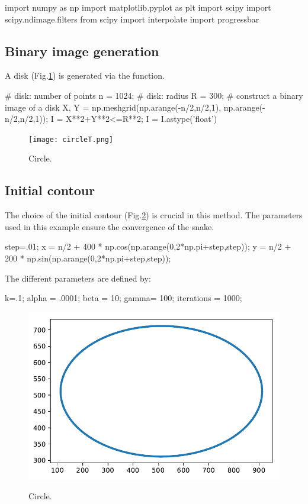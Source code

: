 \def\QRCODE{MASTER_mispa_TUT.IMG.active_contours_pythonqrcode.png}
\def\QRPAGE{http://www.iptutorials.science/tree/master/MASTER_mispa/TUT.IMG.active_contours/python}

\begin{python}
import numpy as np
import matplotlib.pyplot as plt
import scipy
import scipy.ndimage.filters
from scipy import interpolate
import progressbar
\end{python}

\subsection{Binary image generation}
A disk (Fig.\ref{fig:snakes:python:circle}) is generated via the  function.
\begin{python}
# disk: number of points
n = 1024;
# disk: radius
R = 300;
# construct a binary image of a disk
X, Y = np.meshgrid(np.arange(-n/2,n/2,1), np.arange(-n/2,n/2,1));
I = X**2+Y**2<=R**2;
I = I.astype('float')
\end{python}
\begin{figure}[htbp]
\centering\caption{Circle.}%
 \texttt{[image: circleT.png]}
 \label{fig:snakes:python:circle}
\end{figure}

\vspace*{-12pt}

\subsection{Initial contour}
The choice of the initial contour (Fig.\ref{fig:snakes:python:ellipse}) is crucial in this method. The parameters used in this example ensure the convergence of the snake.

\begin{python}
step=.01;
x = n/2 + 400 * np.cos(np.arange(0,2*np.pi+step,step));
y = n/2 + 200 * np.sin(np.arange(0,2*np.pi+step,step));
\end{python}

The different parameters are defined by:
\begin{python}
k=.1;
alpha = .0001;
beta = 10;
gamma= 100;
iterations = 1000;
\end{python}

\begin{figure}[H]
\centering\caption{Circle.}%
 \includegraphics[width=.5\linewidth]{ellipse.pdf}%
 \label{fig:snakes:python:ellipse}%
\end{figure}

